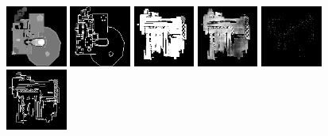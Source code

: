 \begin{figure}[h!]
\begin{minipage}[b]{\linewidth}
	\begin{center}
		\includegraphics[width=2cm]{figures/results/samples/cond/sample2_map_heightmap_true.png}
		\includegraphics[width=2cm]{figures/results/samples/cond/sample2_map_wallmap_true.png}
		\hfill 
		\includegraphics[width=2cm]{figures/results/samples/cond/sample2_map_floormap_generated.png}
		\includegraphics[width=2cm]{figures/results/samples/cond/sample2_map_heightmap_generated.png}
		\includegraphics[width=2cm]{figures/results/samples/cond/sample2_map_thingsmap_generated.png}
		\includegraphics[width=2cm]{figures/results/samples/cond/sample2_map_wallmap_generated.png}
	\end{center}
	

\end{minipage}
\end{figure}

